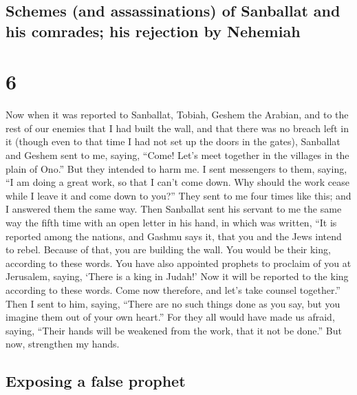 \hypertarget{schemes-and-assassinations-of-sanballat-and-his-comrades-his-rejection-by-nehemiah}{%
\subsection{Schemes (and assassinations) of Sanballat and his comrades;
his rejection by
Nehemiah}\label{schemes-and-assassinations-of-sanballat-and-his-comrades-his-rejection-by-nehemiah}}

\hypertarget{section-5}{%
\section{6}\label{section-5}}

 Now when it was reported to Sanballat, Tobiah, Geshem the
Arabian, and to the rest of our enemies that I had built the wall, and
that there was no breach left in it (though even to that time I had not
set up the doors in the gates),  Sanballat and Geshem sent
to me, saying, ``Come! Let's meet together in the villages in the plain
of Ono.'' But they intended to harm me.  I sent messengers
to them, saying, ``I am doing a great work, so that I can't come down.
Why should the work cease while I leave it and come down to you?''
 They sent to me four times like this; and I answered them
the same way.  Then Sanballat sent his servant to me the
same way the fifth time with an open letter in his hand, 
in which was written, ``It is reported among the nations, and Gashmu
says it, that you and the Jews intend to rebel. Because of that, you are
building the wall. You would be their king, according to these words.
 You have also appointed prophets to proclaim of you at
Jerusalem, saying, `There is a king in Judah!' Now it will be reported
to the king according to these words. Come now therefore, and let's take
counsel together.''  Then I sent to him, saying, ``There
are no such things done as you say, but you imagine them out of your own
heart.''  For they all would have made us afraid, saying,
``Their hands will be weakened from the work, that it not be done.'' But
now, strengthen my hands.

\hypertarget{exposing-a-false-prophet}{%
\subsection{Exposing a false prophet}\label{exposing-a-false-prophet}}

